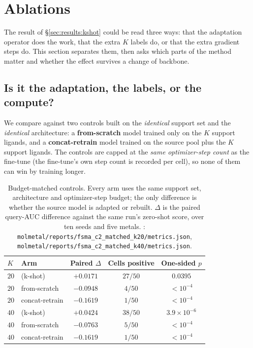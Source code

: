 \section{Ablations}
\label{sec:ablation}

The \fsma{} result of \S\ref{sec:results:kshot} could be read three ways: that
the adaptation operator does the work, that the extra $K$ labels do, or that the
extra gradient steps do. This section separates them, then asks which parts of
the method matter and whether the effect survives a change of backbone.

\subsection{Is it the adaptation, the labels, or the compute?}
\label{sec:ablation:controls}

We compare \fsma{} against two controls built on the \emph{identical} support
set and the \emph{identical} architecture: a \textbf{from-scratch} model trained
only on the $K$ support ligands, and a \textbf{concat-retrain} model trained on
the source pool plus the $K$ support ligands. The controls are capped at the
\emph{same optimizer-step count} as the \fsma{} fine-tune (the fine-tune's own
step count is recorded per cell), so none of them can win by training longer.

\begin{table}[t]
\centering
\caption{Budget-matched controls. Every arm uses the same support set,
architecture and optimizer-step budget; the only difference is whether the
source model is adapted or rebuilt. $\Delta$ is the paired query-AUC difference
against the same run's zero-shot score, over ten seeds and five metals.
\MEASURED: \texttt{molmetal/reports/fsma\_c2\_matched\_k20/metrics.json},
\texttt{molmetal/reports/fsma\_c2\_matched\_k40/metrics.json}.}
\label{tab:controls}
\small
\begin{tabular}{llccc}
\toprule
$K$ & Arm & Paired $\Delta$ & Cells positive & One-sided $p$ \\
\midrule
$20$ & \fsma{} (k-shot)     & $+0.0171$ & $27/50$ & $0.0395$ \\
$20$ & from-scratch        & $-0.0948$ & $4/50$  & $<10^{-4}$ \\
$20$ & concat-retrain      & $-0.1619$ & $1/50$  & $<10^{-4}$ \\
\midrule
$40$ & \fsma{} (k-shot)     & $+0.0424$ & $38/50$ & $3.9\times10^{-6}$ \\
$40$ & from-scratch        & $-0.0763$ & $5/50$  & $<10^{-4}$ \\
$40$ & concat-retrain      & $-0.1619$ & $1/50$  & $<10^{-4}$ \\
\bottomrule
\end{tabular}
\end{table}

